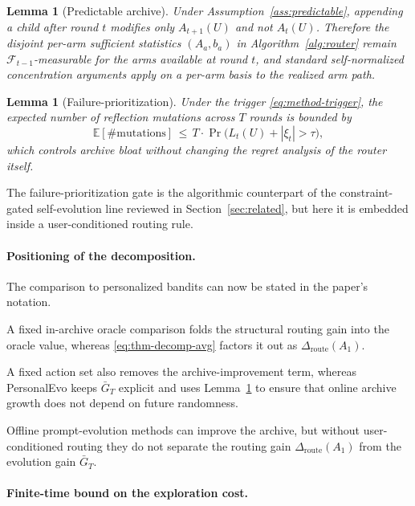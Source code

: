 \documentclass{article} %
\newtheorem{lemma}[theorem]{Lemma}
\providecommand{\E}{\mathbb{E}}
\begin{document}
\begin{lemma}[Predictable archive]
\label{lem:predictable}
Under Assumption~\ref{ass:predictable}, appending a child after round $t$ modifies only $A_{t+1}(U)$ and not $A_t(U)$. Therefore the disjoint per-arm sufficient statistics $(A_a, b_a)$ in Algorithm~\ref{alg:router} remain $\mathcal{F}_{t-1}$-measurable for the arms available at round $t$, and standard self-normalized concentration arguments apply on a per-arm basis to the realized arm path.
\end{lemma}

\begin{lemma}[Failure-prioritization]
\label{lem:failure}
Under the trigger \eqref{eq:method-trigger}, the expected number of reflection mutations across $T$ rounds is bounded by
\begin{equation}
\label{eq:lem-failure}
\E[\#\mathrm{mutations}] \,\le\, T \cdot \Pr\bigl(L_t(U) + |\xi_t| > \tau\bigr),
\end{equation}
which controls archive bloat without changing the regret analysis of the router itself.
\end{lemma}

The failure-prioritization gate is the algorithmic counterpart of the constraint-gated self-evolution line reviewed in Section~\ref{sec:related}, but here it is embedded inside a user-conditioned routing rule.

\paragraph{Positioning of the decomposition.}
The comparison to personalized bandits can now be stated in the paper's notation.

A fixed in-archive oracle comparison folds the structural routing gain into the oracle value, whereas \eqref{eq:thm-decomp-avg} factors it out as $\Delta_{\mathrm{route}}(A_1)$.

A fixed action set also removes the archive-improvement term, whereas PersonalEvo keeps $\bar G_T$ explicit and uses Lemma~\ref{lem:predictable} to ensure that online archive growth does not depend on future randomness.

Offline prompt-evolution methods can improve the archive, but without user-conditioned routing they do not separate the routing gain $\Delta_{\mathrm{route}}(A_1)$ from the evolution gain $\bar G_T$.

\paragraph{Finite-time bound on the exploration cost.}
\end{document}
